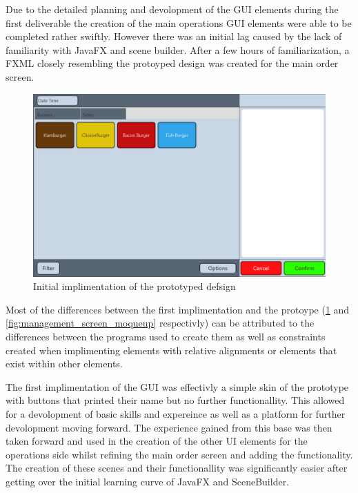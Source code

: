 Due to the detailed planning and devolopment of the GUI elements during the first deliverable the creation of the main operations GUI elements were able to be completed rather swiftly. However there was an initial lag caused by the lack of familiarity with JavaFX and scene builder. After a few hours of familiarization, a FXML closely resembling the protoyped design was created for the main order screen. 

\begin{figure}[ht]
	\centering
	\includegraphics[width=150mm]{images/old_order_screen.png}
	\caption{Initial implimentation of the prototyped defsign}
	\label{fig:old_order_screen}
\end{figure}

Most of the differences between the first implimentation and the protoype (\ref{fig:old_order_screen} and \ref{fig:management_screen_moqueup} respectivly) can be attributed to the differences between the programs used to create them as well as constraints created when implimenting elements with relative alignments or elements that exist within other elements. 

The first implimentation of the GUI was effectivly a simple skin of the prototype with buttons that printed their name but no further functionallity. This allowed for a devolopment of basic skills and expereince as well as a platform for further devolopment moving forward. The experience gained from this base was then taken forward and used in the creation of the other UI elements for the operations side whilst refining the main order screen and adding the functionality. The creation of these scenes and their functionallity was significantly easier after getting over the initial learning curve of JavaFX and SceneBuilder.

